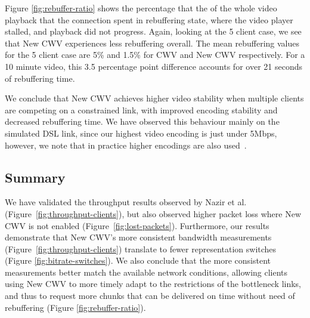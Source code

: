 \documentclass[10pt,sigconf,anonymous]{acmart}
\begin{document}
Figure \ref{fig:rebuffer-ratio} shows the percentage that the of the whole video playback that the connection spent in rebuffering state, where the video player stalled, and playback did not progress. Again, looking at the 5 client case, we see that New CWV experiences less rebuffering overall. The mean rebuffering values for the 5 client case are 5\% and 1.5\% for CWV and New CWV respectively. For a 10 minute video, this 3.5 percentage point difference accounts for over 21 seconds of rebuffering time.


We conclude that New CWV achieves higher video stability when multiple clients are competing on a constrained link, with improved encoding stability and decreased rebuffering time. We have observed this behaviour mainly on the simulated DSL link, since our highest video encoding is just under 5Mbps, however, we note that in practice higher encodings are also used~\cite{online-youtube-encodings}.

\subsection{Summary}
\label{sec:summary}

We have validated the throughput results observed by Nazir et al.~\cite{Nazir-2014-performance-evaluation-congestion-window-validation-dash-newcwv} (Figure~\ref{fig:throughput-clients}), but also observed higher packet loss where New CWV is not enabled (Figure~\ref{fig:lost-packets}). Furthermore, our results demonstrate that New CWV's more consistent bandwidth measurements (Figure~\ref{fig:throughput-clients}) translate to fewer representation switches (Figure \ref{fig:bitrate-switches}). We also conclude that the more consistent measurements better match the available network conditions, allowing clients using New CWV to more timely adapt to the restrictions of the bottleneck links, and thus to request more chunks that can be delivered on time without need of rebuffering (Figure \ref{fig:rebuffer-ratio}).

\end{document}
